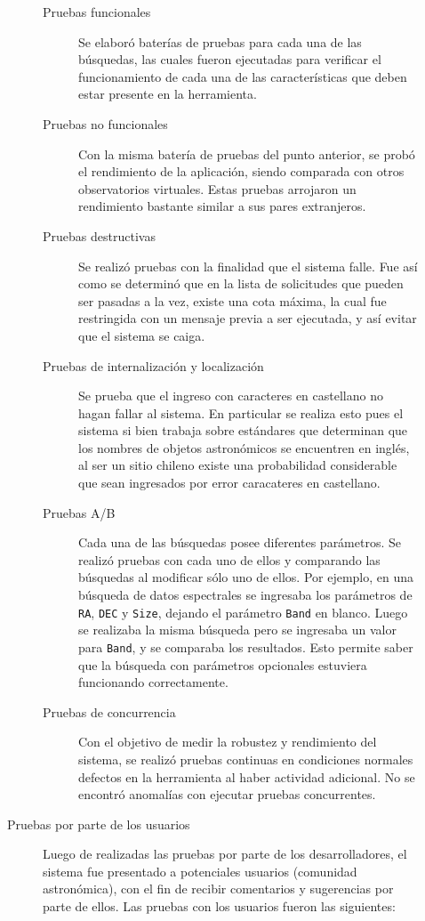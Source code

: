 \begin{description}
\begin{description}
\begin{description}
					\item[Pruebas funcionales] Se elaboró baterías de pruebas para cada una de las búsquedas, las cuales fueron ejecutadas para verificar el funcionamiento de cada una de las características que deben estar presente en la herramienta.
					\item[Pruebas no funcionales] Con la misma batería de pruebas del punto anterior, se probó el rendimiento de la aplicación, siendo comparada con otros observatorios virtuales. Estas pruebas arrojaron un rendimiento bastante similar a sus pares extranjeros.
					\item[Pruebas destructivas] Se realizó pruebas con la finalidad que el sistema falle. Fue así como se determinó que en la lista de solicitudes que pueden ser pasadas a la vez, existe una cota máxima, la cual fue restringida con un mensaje previa a ser ejecutada, y así evitar que el sistema se caiga.
					\item[Pruebas de internalización y localización] Se prueba que el ingreso con caracteres en castellano no hagan fallar al sistema. En particular se realiza esto pues el sistema si bien trabaja sobre estándares que determinan que los nombres de objetos astronómicos se encuentren en ingl\'es, al ser un sitio chileno existe una probabilidad considerable que sean ingresados por error caracateres en castellano.
					\item[Pruebas A/B] Cada una de las búsquedas posee diferentes parámetros. Se realizó pruebas con cada uno de ellos y comparando las búsquedas al modificar sólo uno de ellos. Por ejemplo, en una búsqueda de datos espectrales se ingresaba los parámetros de \verb;RA;, \verb;DEC; y \verb;Size;, dejando el parámetro \verb;Band; en blanco. Luego se realizaba la misma búsqueda pero se ingresaba un valor para \verb;Band;, y se comparaba los resultados. Esto permite saber que la búsqueda con parámetros opcionales estuviera funcionando correctamente.
					\item[Pruebas de concurrencia] Con el objetivo de medir la robustez y rendimiento del sistema, se realizó pruebas continuas en condiciones normales defectos en la herramienta al haber actividad adicional. No se encontró anomalías con ejecutar pruebas concurrentes.
				\end{description}
			\item [Pruebas por parte de los usuarios] Luego de realizadas las pruebas por parte de los desarrolladores, el sistema fue presentado a potenciales usuarios (comunidad astronómica), con el fin de recibir comentarios y sugerencias por parte de ellos. Las pruebas con los usuarios fueron las siguientes:

\end{description}
\end{description}
